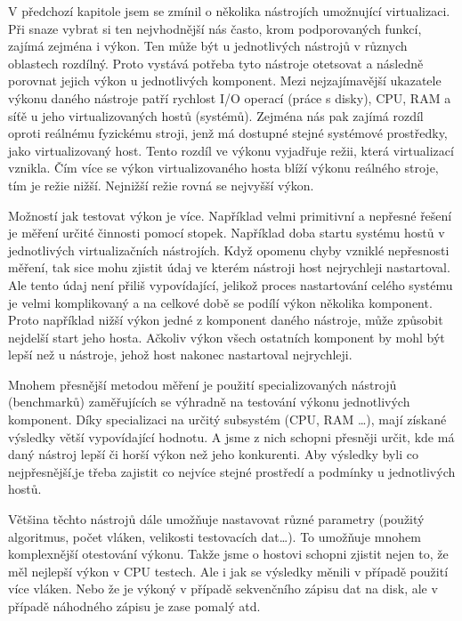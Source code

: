 V předchozí kapitole jsem se zmínil o několika nástrojích umožnující virtualizaci. Při snaze vybrat si ten nejvhodnější nás často, krom podporovaných funkcí, zajímá zejména i výkon. Ten může být u jednotlivých nástrojů v různych oblastech rozdílný. Proto vystává potřeba tyto nástroje otetsovat a následně porovnat jejich výkon u jednotlivých komponent. Mezi nejzajímavější ukazatele výkonu daného nástroje patří rychlost I/O operací (práce s disky), CPU, RAM a síťě u jeho virtualizovaných hostů (systémů). Zejména nás pak zajímá rozdíl oproti reálnému fyzickému stroji, jenž má dostupné stejné systémové prostředky, jako virtualizovaný host. Tento rozdíl ve výkonu vyjadřuje režii, která virtualizací vznikla. Čím více se výkon virtualizovaného hosta blíží výkonu reálného stroje, tím je režie nižší. Nejnižší režie rovná se nejvyšší výkon. 

Možností jak testovat výkon je více. Například velmi primitivní a nepřesné řešení je měření určité činnosti pomocí stopek. Například doba startu systému hostů v jednotlivých virtualizačních nástrojích. Když opomenu chyby vzniklé nepřesnosti měření, tak sice mohu zjistit údaj ve kterém nástroji host nejrychleji nastartoval. Ale tento údaj není přiliš vypovídající, jelikož proces nastartování celého systému je velmi komplikovaný a na celkové době se podílí výkon několika komponent. Proto například nižší výkon jedné z komponent daného nástroje, může způsobit nejdelší start jeho hosta. Ačkoliv výkon všech ostatních komponent by mohl být lepší než u nástroje, jehož host nakonec nastartoval nejrychleji.

Mnohem přesnější metodou měření je použití specializovaných nástrojů (benchmarků) zaměřujících se výhradně na testování výkonu jednotlivých komponent. Díky specializaci na určitý subsystém (CPU, RAM \dots), mají získané výsledky větší vypovídající hodnotu. A jsme z nich schopni přesněji určit, kde má daný nástroj lepší či horší výkon než jeho konkurenti. Aby výsledky byli co nejpřesnější,je třeba zajistit co nejvíce stejné prostředí a podmínky u jednotlivých hostů.

Většina těchto nástrojů dále umožňuje nastavovat různé parametry (použitý algoritmus, počet vláken, velikosti testovacích dat\dots). To umožňuje mnohem komplexnější otestování výkonu. Takže jsme o hostovi schopni zjistit nejen to, že měl nejlepší výkon v CPU testech. Ale i jak se výsledky měnili v případě použití více vláken. Nebo že je výkoný v případě sekvenčního zápisu dat na disk, ale v případě náhodného zápisu je zase pomalý atd.


